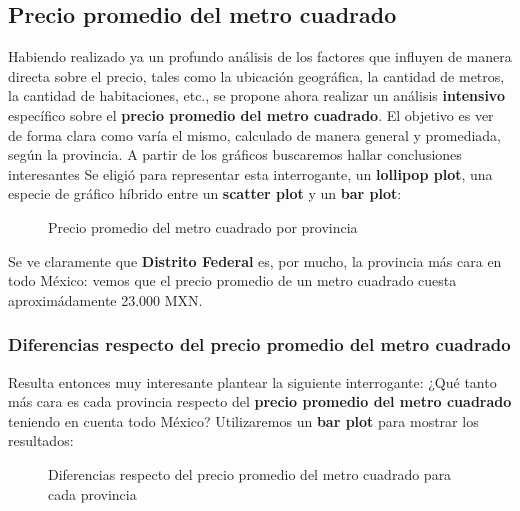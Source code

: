\documentclass[
10pt, %
a4paper, %
oneside, %
headinclude,footinclude, %
BCOR5mm, %
]{scrartcl}
\begin{document}
\newpage    
\subsection{Precio promedio del metro cuadrado}
    Habiendo realizado ya un profundo an\'alisis de los factores que influyen de manera directa sobre el precio, tales como la ubicaci\'on geogr\'afica, la cantidad de metros, la cantidad de habitaciones, etc., se propone ahora realizar un an\'alisis \textbf{intensivo} espec\'ifico sobre el \textbf{precio promedio del metro cuadrado}.
    \vskip 2mm
    El objetivo es ver de forma clara como var\'ia el mismo, calculado de manera general y promediada, seg\'un la provincia. A partir de los gr\'aficos buscaremos hallar conclusiones interesantes
    \vskip 2mm
    Se eligi\'o para representar esta interrogante, un \textbf{lollipop plot}, una especie de gr\'afico h\'ibrido entre un \textbf{scatter plot} y un \textbf{bar plot}:
    
    \begin{figure}[H]
        \caption{Precio promedio del metro cuadrado por provincia}
        \label{fig:precio-metrocuadrado-provincia}
    \end{figure}
    
    Se ve claramente que \textbf{Distrito Federal} es, por mucho, la provincia m\'as cara en todo M\'exico: vemos que el precio promedio de un metro cuadrado cuesta aproxim\'adamente 23.000 MXN.
    
    
    \subsubsection{Diferencias respecto del precio promedio del metro cuadrado}
    Resulta entonces muy interesante plantear la siguiente interrogante: ¿Qu\'e tanto m\'as cara es cada provincia respecto del \textbf{precio promedio del metro cuadrado} teniendo en cuenta todo M\'exico?
    \vskip 2mm
    Utilizaremos un \textbf{bar plot} para mostrar los resultados:
    
    \begin{figure}[H]
        \caption{Diferencias respecto del precio promedio del metro cuadrado para cada provincia}
        \label{fig:precio-metrocuadrado-diferencia-provincia}
    \end{figure}
    
\end{document}
